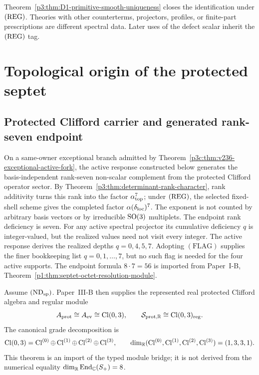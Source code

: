 \documentclass[12pt,a4paper]{article}
\begin{document}
\begin{remark}
\label{p3:rem:delta-closure-scope}
Theorem~\ref{p3:thm:D1-primitive-smooth-uniqueness} closes the identification
under \(({\rm REG})\).  Theories with other counterterms, projectors, profiles,
or finite-part prescriptions are different spectral data.  Later uses of the
defect scalar inherit the \(({\rm REG})\) tag.
\end{remark}



\section{Topological origin of the protected septet}
\label{paper3c:sec:organized-rank}
\subsection{Protected Clifford carrier and generated rank-seven endpoint}
\label{p3:sec:hierarchy-origin}

On a same-owner exceptional branch admitted by Theorem~\ref{p3c:thm:v236-exceptional-active-fork}, the active response
constructed below generates the basis-independent rank-seven non-scalar
complement from the protected Clifford operator sector.  By
Theorem~\ref{p3:thm:determinant-rank-character}, rank additivity
turns this rank into the factor \(\alpha_{\rm top}^7\); under
\(({\rm REG})\), the selected fixed-shell scheme gives the completed factor
\(\alpha(\delta_{\rm loc})^7\).  The exponent is not counted by arbitrary
basis vectors or by irreducible \(\mathrm{SO}(3)\) multiplets.  The endpoint rank
deficiency is seven.  For any active spectral projector its cumulative
deficiency \(q\) is integer-valued, but the realized values need not visit
every integer.  The active response derives the realized depths
\(q=0,4,5,7\).  Adopting \((\mathrm{FLAG})\) supplies the finer bookkeeping
list \(q=0,1,\ldots,7\), but no such flag is needed for the four active
supports.  The endpoint formula \(8\cdot7=56\) is
imported from Paper~I-B, Theorem~\ref{p1:thm:septet-octet-resolution-module}.

\begin{theorem}
\label{p3:thm:clifford-dim}
Assume \((\mathrm{ND}_{\rm sp})\).  Paper~III-B then supplies the represented
real protected Clifford algebra and regular module
\[
        A_{\rm prot}\cong A_{\rm ev}\cong\operatorname{Cl}(0,3),
        \qquad
        \mathcal S_{{\rm prot},\mathbb R}\cong\operatorname{Cl}(0,3)_{\rm reg}.
\]
The canonical grade decomposition is
\[
\operatorname{Cl}(0,3)=\operatorname{Cl}^{(0)}\oplus\operatorname{Cl}^{(1)}\oplus\operatorname{Cl}^{(2)}\oplus\operatorname{Cl}^{(3)},
\qquad
\dim_{\mathbb R}(\operatorname{Cl}^{(0)},\operatorname{Cl}^{(1)},\operatorname{Cl}^{(2)},\operatorname{Cl}^{(3)})=(1,3,3,1).
\]
This theorem is an import of the typed module bridge; it is not derived from
the numerical equality
\(\dim_{\mathbb R}\operatorname{End}_{\mathbb C}(S_+)=8\).
\end{theorem}
\end{document}
